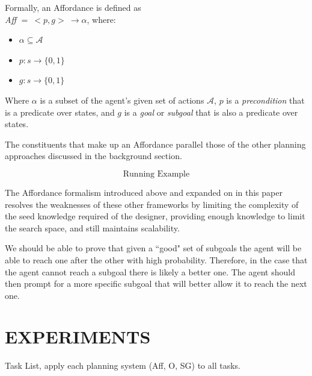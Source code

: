 \documentclass[]{article}
\begin{document}
Formally, an Affordance is defined as \vspace{1 mm} \\
{\it Aff} $ =\ <p,g>\ \longrightarrow \alpha$, where:

\begin{itemize}
\item[] $\alpha \subseteq \mathcal{A}$
\item[] $p : s \longrightarrow \{$0$, 1\}$
\item[] $g : s \longrightarrow \{$0$,1\}$
\end{itemize}

Where $\alpha$ is a subset of the agent's given set of actions $\mathcal{A}$, $p$ is a {\it precondition} that is a predicate over states, and $g$ is a {\it goal} or {\it subgoal} that is also a predicate over states.

The constituents that make up an Affordance parallel those of the other planning approaches discussed in the background section.

\[
\boxed{\text{Running Example}}
\]


The Affordance formalism introduced above and expanded on in this paper resolves the weaknesses of these other frameworks by limiting the complexity of the seed knowledge required of the designer, providing enough knowledge to limit the search space, and still maintains scalability.

We should be able to prove that given a ``good" set of subgoals the agent will be able to reach one after the other with high probability. Therefore, in the case that the agent cannot reach a subgoal there is likely a better one. The agent should then prompt for a more specific subgoal that will better allow it to reach the next one.

\section{EXPERIMENTS}

Task List, apply each planning system (Aff, O, SG) to all tasks.


\end{document}
